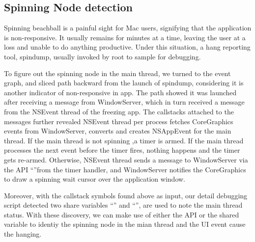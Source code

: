 \subsection{Spinning Node detection}

Spinning beachball is a painful sight for Mac users, signifying that the
application is non-responsive. It usually remains for minutes at a time, leaving
the user at a loss and unable to do anything productive. Under this situation, a
hang reporting tool, spindump, usually invoked by root to sample for debugging.

To figure out the spinning node in the main thread, we turned to the event
graph, and sliced path backward from the launch of spindump, considering it is
another indicator of non-responsive in app. The path showed it was launched
after receiving a message from WindowServer, which in turn received a message
from the NSEvent thread of the freezing app. The callstacks attached to the
messages further revealed NSEvent thread per process fetches CoreGraphics events
from WindowServer, converts and creates NSAppEvent for the main thread. If the
main thread is not spinning ,a timer is armed. If the main thread processes
the next event before the timer fires, nothing happens and the timer gets
re-armed. Otherwise, NSEvent thread sends a message to WindowServer via the
API ``''from the timer handler, and WindowServer
notifies the CoreGraphics to draw a spinning wait cursor over the application
window.

Moreover, with the callstack symbols found above as input, our detail debugging
script detected two share variables ``'' and
``'', are used to note the main thread status. With
these discovery, we can make use of either the API or the shared variable to
identiy the spinning node in the mian thread and the UI event cause the hanging.
